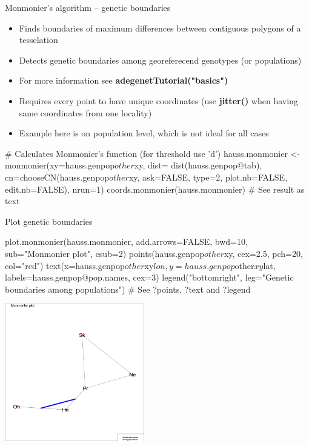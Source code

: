 \documentclass[compress, ucs, xelatex, 11pt, xcolor=svgnames,
  hyperref={
    bookmarks=true,
    unicode=true,
    colorlinks=true,
    pdftitle={Molecular data in R},
    plainpages=false,
    pdfauthor={Vojtech Zeisek},
    pdfsubject={Course about phylogeny and evolution in R},
    pdfcreator={XeLaTeX},
    pdfkeywords={R, evolution, phylogeny, molecular data},
    linkcolor=Tomato,
    anchorcolor=SaddleBrown,
    citecolor=Goldenrod,
    filecolor=DarkMagenta,
    menucolor=Sienna,
    urlcolor=DarkTurquoise,
    pdftex},
  url={hyphens, lowtilde} %
  ]{beamer}
\begin{document}
\begin{frame}[fragile]{Monmonier's algorithm -- genetic boundaries}
\begin{itemize}
 \item Finds boundaries of maximum differences between contiguous polygons of a tesselation
 \item Detects genetic boundaries among georeferecend genotypes (or populations)
 \item For more information see \textbf{adegenetTutorial("basics")}
 \item Requires every point to have unique coordinates (use \textbf{jitter()} when having same coordinates from one locality)
 \item Example here is on population level, which is not ideal for all cases
\end{itemize}
  \begin{spluscode}
    # Calculates Monmonier's function (for threshold use 'd')
    hauss.monmonier <- monmonier(xy=hauss.genpop$other$xy, dist=
      dist(hauss.genpop@tab), cn=chooseCN(hauss.genpop$other$xy,
      ask=FALSE, type=2, plot.nb=FALSE, edit.nb=FALSE), nrun=1)
    coords.monmonier(hauss.monmonier) # See result as text
  \end{spluscode}
\end{frame}

\begin{frame}[fragile]{Plot genetic boundaries}
\begin{multicols}{2}
  \begin{spluscode}
    plot.monmonier(hauss.monmonier,
      add.arrows=FALSE, bwd=10,
      sub="Monmonier plot", csub=2)
    points(hauss.genpop$other$xy,
      cex=2.5, pch=20, col="red")
    text(x=hauss.genpop$other$xy$lon,
      y=hauss.genpop$other$xy$lat,
      labels=hauss.genpop@pop.names,
      cex=3)
    legend("bottomright",
      leg="Genetic boundaries\n
      among populations")
    # See ?points, ?text and ?legend
  \end{spluscode}
  \includegraphics[height=6cm]{monmonier.png}
\end{multicols}
\end{frame}
\end{document}
